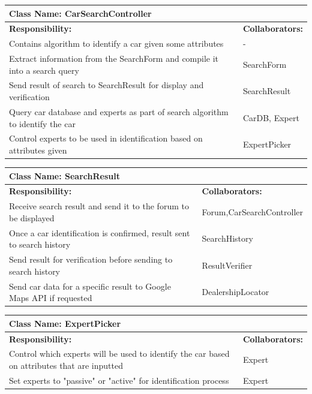 \documentclass[12pt]{article}
\begin{document}
	\begin{table}[ht]
		\centering
		\begin{tabular}{|p{5cm}|p{5cm}|}
		\hline
		 \multicolumn{2}{|l|}{\textbf{Class Name:} CarSearchController} \\
		\hline
		\textbf{Responsibility:} & \textbf{Collaborators:} \\
		\hline
		Contains algorithm to identify a car given some attributes & -\\
		\hline
	    Extract information from the SearchForm and compile it into a search query & SearchForm\\
	    \hline
	    Send result of search to SearchResult for display and verification & SearchResult\\
	    \hline
	    Query car database and experts as part of search algorithm to identify the car & CarDB, Expert\\
	    \hline
	    Control experts to be used in identification based on attributes given & ExpertPicker\\
		\hline
		\end{tabular}
	\end{table}

	\begin{table}[ht]
		\centering
		\begin{tabular}{|p{5cm}|p{5cm}|}
		\hline
		 \multicolumn{2}{|l|}{\textbf{Class Name:} SearchResult} \\
		\hline
		\textbf{Responsibility:} & \textbf{Collaborators:} \\
		\hline
		Receive search result and send it to the forum to be displayed  & Forum,CarSearchController\\
		\hline
		Once a car identification is confirmed, result sent to search history & SearchHistory\\
		\hline
		Send result for verification before sending to search history & ResultVerifier\\
		\hline
		Send car data for a specific result to Google Maps API if requested & DealershipLocator\\
		\hline
		\end{tabular}
	\end{table}

	\begin{table}[ht]
		\centering
		\begin{tabular}{|p{5cm}|p{5cm}|}
		\hline
		 \multicolumn{2}{|l|}{\textbf{Class Name:} ExpertPicker} \\
		\hline
		\textbf{Responsibility:} & \textbf{Collaborators:} \\
		\hline
		Control which experts will be used to identify the car based on attributes that are inputted & Expert\\
		\hline
		Set experts to "passive" or "active" for identification process & Expert\\
		\hline
		\end{tabular}
	\end{table}
\end{document}
